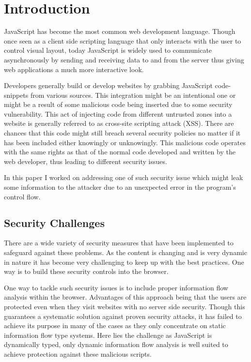 \chapter{Introduction}


JavaScript has become the most common web development language. Though once seen as a client side scripting language that only interacts with the user to control visual layout, today JavaScript is widely used to communicate asynchronously by sending and receiving data to and from the server thus giving web applications a much more interactive look. 

Developers generally build or develop websites by grabbing JavaScript code-snippets from various sources.  This integration might be an intentional one or might be a result of some malicious code being inserted due to some security vulnerability. This act of injecting code from different untrusted zones into a website is generally referred to as cross-site scripting attack (XSS). There are chances that this code might still breach several security policies no matter if it has been included either knowingly or unknowingly. This malicious code operates with the same rights as that of the normal code developed and written by the web developer, thus leading to different security issues. 

In this paper I worked on addressing one of such security issue which might leak some information to the attacker due to an unexpected error in the program's control flow.


\section{Security Challenges} 

There are a wide variety of security measures that have been implemented to safeguard against these problems. As the content is changing and is very dynamic in nature it has become very challenging to keep up with the best practices. One way is to build these security controls into the browser.

One way to tackle such security issues is to include proper information flow analysis within the browser. Advantages of this approach being that the users are protected even when they visit websites with no server side security. Though this guarantees a systematic solution against proven security attacks, it has failed to achieve its purpose in many of the cases as they only concentrate on static information flow type systems. Here lies the challenge as JavaScript is dynamically typed, only dynamic information flow analysis is well suited to achieve protection against these malicious scripts.


